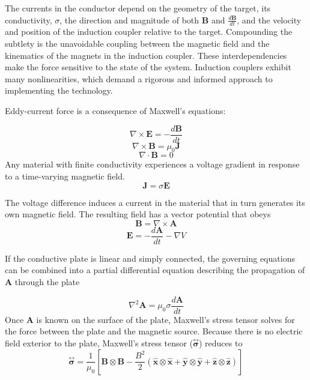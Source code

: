 The currents in the conductor depend on the geometry of the target, its conductivity, $\sigma$, the direction and magnitude of both \textbf{B} and $\frac{d\textbf{B}}{dt}$, and the velocity and position of the induction coupler relative to the target. Compounding the subtlety is the unavoidable coupling between the magnetic field and the kinematics of the magnets in the induction coupler. These interdependencies make the force sensitive to the state of the system. Induction couplers exhibit many nonlinearities, which demand a rigorous and informed approach to implementing the technology.

Eddy-current force is a consequence of Maxwell's equations:

\begin{equation}\label{eq:FaradayInduction}
\nabla \times \textbf{E} = -\frac{d\textbf{B}}{dt}
\end{equation}
\begin{equation}\label{eq:AmperesLaw}
\nabla \times \textbf{B} = \mu_0 \textbf{J}
\end{equation}
\begin{equation}\label{eq:GaussLaw}
\nabla \cdot \textbf{B} = 0
\end{equation}
Any material with finite conductivity experiences a voltage gradient in response to a time-varying magnetic field. 
\begin{equation}\label{eq:currentflow}
\textbf{J}=\sigma \textbf{E}
\end{equation}

The voltage difference induces a current in the material that in turn generates its own magnetic field. The resulting field has a vector potential that obeys 
\begin{equation}\label{eq:vectorPotential}
\textbf{B} = \nabla \times \textbf{A}
\end{equation}
\begin{equation} \label{eq:Efield}
\textbf{E} =  -\frac{d\textbf{A}}{dt} - \nabla V
\end{equation}

If the conductive plate is linear and simply connected, the governing equations can be combined into a partial differential equation describing the propagation of $\textbf{A}$ through the plate \cite{Smyth1989}

\begin{equation}\label{eq:governingPDE}
\nabla^2 \textbf{A} = \mu_0\sigma \frac{d\textbf{A}}{dt}
\end{equation}
Once \textbf{A} is known on the surface of the plate, Maxwell's stress tensor solves for the force between the plate and the magnetic source. Because there is no electric field exterior to the plate, Maxwell's stress tensor ($\overset{\leftrightarrow  }{ \mathbf{\sigma} }$) reduces to
\begin{equation} \label{eq:stressTensor}
\overset{\leftrightarrow  }{ \mathbf{\sigma} } = \frac{1}{\mu_0} \left[ \mathbf{B}\otimes\mathbf{B} - \frac{B^2 }{2} (\mathbf{\hat x}\otimes\mathbf{\hat x} + \mathbf{\hat y}\otimes\mathbf{\hat y} + \mathbf{\hat z}\otimes\mathbf{\hat z}) \right]
\end{equation}

